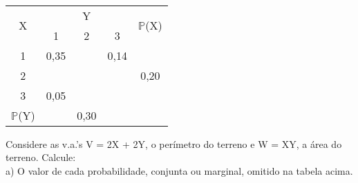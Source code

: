 \documentclass[12pt,a4paper]{article}
\begin{document}
	\vspace{0.25cm}\\
	\begin{center}
		\begin{tabular}{|c|c|c|c|c|}\hline
			\multirow{2}{*}{X} & \multicolumn{3}{c|}{Y} & \multirow{2}{*}{$\mathbb{P}$(X)}\\ \cline{2-4}
			& 1 & 2 & 3 & \\ \hline
			1 & 0,35 & & 0,14 & \\ \hline
			2 & & & & 0,20\\ \hline
			3 & 0,05 & & & \\ \hline
			$\mathbb{P}$(Y) & & 0,30 & & \\ \hline	
		\end{tabular}
	\end{center}
	\vspace{0.25cm}
	Considere as v.a.'s V = 2X + 2Y, o perímetro do terreno e W = XY, a área do terreno. Calcule:\\
	a) O valor de cada probabilidade, conjunta ou marginal, omitido na tabela acima.\\
	\vspace{0.5cm}
\end{document}
